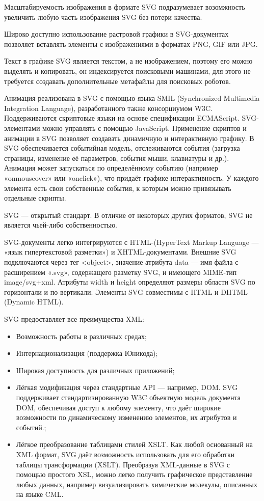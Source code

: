 Масштабируемость изображения в формате SVG подразумевает возомжность увеличить любую часть изображения SVG без потери качества.

Широко доступно использование растровой графики в SVG-документах позволяет вставлять элементы с изображениями в форматах PNG, GIF или JPG.

Текст в графике SVG является текстом, а не изображением, поэтому его можно выделять и копировать, он индексируется поисковыми машинами, для этого не требуется создавать дополнительные метафайлы для поисковых роботов.

Анимация реализована в SVG с помощью языка SMIL (Synchronized Multimedia Integration Language), разработанного также консорциумом W3C. Поддерживаются скриптовые языки на основе спецификации ECMAScript. SVG-элементами можно управлять с помощью JavaScript. Применение скриптов и анимации в SVG позволяет создавать динамичную и интерактивную графику. В SVG обеспечивается событийная модель, отслеживаются события (загрузка страницы, изменение её параметров, события мыши, клавиатуры и др.). Анимация может запускаться по определённому событию (например «onmouseover» или «onclick»), что придаёт графике интерактивность. У каждого элемента есть свои собственные события, к которым можно привязывать отдельные скрипты.

SVG — открытый стандарт. В отличие от некоторых других форматов, SVG не является чьей-либо собственностью.

SVG-документы легко интегрируются с HTML-(HyperText Markup Language — «язык гипертекстовой разметки») и XHTML-документами. Внешние SVG подключаются через тег <object>, значение атрибута data — имя файла с расширением «.svg», содержащего разметку SVG, и имеющего MIME-тип image/svg+xml. Атрибуты width и height определяют размеры области SVG по горизонтали и по вертикали. Элементы SVG совместимы с HTML и DHTML (Dynamic HTML).

SVG предоставляет все преимущества XML:
\begin{itemize}
	\item Возможность работы в различных средах;
	\item Интернационализация (поддержка Юникода);
	\item Широкая доступность для различных приложений;
	\item Лёгкая модификация через стандартные API — например, DOM. SVG поддерживает стандартизированную W3C объектную модель документа DOM, обеспечивая доступ к любому элементу, что даёт широкие возможности по динамическому изменению элементов, их атрибутов и событий.;
	\item Лёгкое преобразование таблицами стилей XSLT. Как любой основанный на XML формат, SVG даёт возможность использовать для его обработки таблицы трансформации (XSLT). Преобразуя XML-данные в SVG с помощью простого XSL, можно легко получить графическое представление любых данных, например визуализировать химические молекулы, описанных на языке CML.
\end{itemize}

